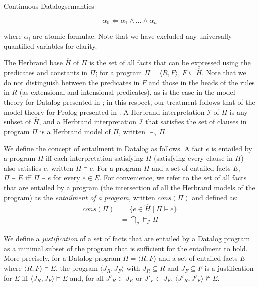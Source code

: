 \begin{nestedsection}{Continuous Datalog}{semantics}
\begin{definition}[Datalog]
\[ \alpha_0 \Leftarrow \alpha_1 \land \ldots \land \alpha_n \]

\noindent where $\alpha_i$ are atomic formulae. Note that we have excluded any
universally quantified variables for clarity.

The Herbrand base $\hat{H}$ of $\Pi$ is the set of all facts that can
be expressed using the predicates and constants in $\Pi$; for a program $\Pi =
\langle R, F \rangle$, $F \subseteq \hat{H}$. Note that we do not
distinguish between the predicates in $F$ and those in the heads of
the rules in $R$ (as extensional and intensional predicates), as is
the case in the model theory for Datalog presented in
\cite{datalog-basics}; in this respect, our treatment follows that of
the model theory for Prolog presented in \cite{prolog-semantics}. A
Herbrand interpretation $\mathcal{I}$ of $\Pi$ is any subset of
$\hat{H}$, and a Herbrand interpretation $\mathcal{I}$ that satisfies
the set of clauses in program $\Pi$ is a Herbrand model of $\Pi$,
written $\models_{\mathcal{I}} \Pi$.

We define the concept of entailment in Datalog as follows. A fact $e$
is entailed by a program $\Pi$ iff each interpretation satisfying
$\Pi$ (satisfying every clause in $\Pi$) also satisfies $e$, written
$\Pi \models e$. For a program $\Pi$ and a set of entailed facts
$E$, $\Pi \models E$ iff $\Pi \models e$ for every $e \in E$. For
convenience, we refer to the set of all facts that are entailed by a
program (the intersection of all the Herbrand models of the program)
as the {\em entailment of a program}, written $cons(\Pi)$ and defined
as:
\begin{align*}
  cons(\Pi) &= \{ e \in \hat{H} \mid \Pi \models e \} \\
  &= \bigcap_\mathcal{I} \models_\mathcal{I} \Pi
\end{align*}
\end{definition}

\begin{definition}[Justification]

We define a {\em justification} of a set of facts that are entailed by
a Datalog program as a minimal subset of the program that is
sufficient for the entailment to hold. More precisely, for a Datalog
program $\Pi = \langle R, F \rangle$ and a set of entailed facts $E$
where $\langle R, F \rangle \models E$, the program $\langle J_R, J_F
\rangle$ with $J_R \subseteq R$ and $J_F \subseteq F$ is a
justification for $E$ iff $\langle J_R, J_F \rangle \models E$ and,
for all $J'_R \subset J_R$ or $J'_F \subset J_F$, $\langle J'_R, J'_F
\rangle \not\models E$.


\end{definition}
\end{nestedsection}

